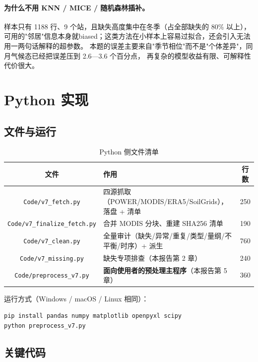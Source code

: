 \documentclass[11pt,a4paper]{ctexart}
\begin{document}
\paragraph{为什么不用 KNN / MICE / 随机森林插补。}
样本只有 1188 行、9 个站，且缺失高度集中在冬季（占全部缺失的 80\% 以上），
可用的"邻居"信息本身就biased；这类方法在小样本上容易过拟合，还会引入无法用一两句话解释的超参数。
本题的误差主要来自"季节相位"而不是"个体差异"，同月气候态已经把误差压到 2.6—3.6 个百分点，
再复杂的模型收益有限、可解释性代价很大。

\section{Python 实现}

\subsection{文件与运行}

\begin{table}[H]\centering\small
\begin{tabularx}{\textwidth}{|c|X|c|}
\toprule
文件 & 作用 & 行数 \\
\midrule
\texttt{Code/v7\_fetch.py} & 四源抓取（POWER/MODIS/ERA5/SoilGrids），落盘 + 清单 & 250 \\
\texttt{Code/v7\_finalize\_fetch.py} & 合并 MODIS 分块、重建 SHA256 清单 & 190 \\
\texttt{Code/v7\_clean.py} & 全量审计（缺失/异常/重复/类型/量纲/不平衡/时序）+ 派生 & 760 \\
\texttt{Code/v7\_missing.py} & 缺失专项排查（本报告第 2 章） & 240 \\
\texttt{Code/preprocess\_v7.py} & \textbf{面向使用者的预处理主程序}（本报告第 5 章） & 360 \\
\bottomrule
\end{tabularx}
\caption{Python 侧文件清单}
\end{table}

运行方式（Windows / macOS / Linux 相同）：
\begin{lstlisting}[language=bash]
pip install pandas numpy matplotlib openpyxl scipy
python preprocess_v7.py
\end{lstlisting}

\subsection{关键代码}
\end{document}

